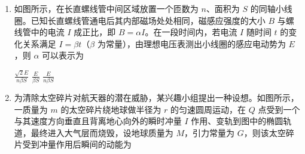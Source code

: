\documentclass[\gkver]{gaokaozhenti}
\begin{document}
\begin{enumerate}
{$\Delta x$ 变大}
{双缝间的距离减小}
{双缝间的距离不变}


\item
如图所示，在长直螺线管中间区域放置一个匝数为 $n$、面积为 $S$ 的同轴小线圈。已知长直螺线管通电后其内部磁场处处相同，磁感应强度的大小 $B$ 与螺线管中的电流 $I$ 成正比，即 $B = \alpha I$。在一段时间内，若电流 $I$ 随时间 $t$ 的变化关系满足 $I = \beta t$（$\beta$ 为常量），由理想电压表测出小线圈的感应电动势为 $E$，则 $\alpha$ 可以表示为

{$\frac{\sqrt{2}E}{n\beta S}$}
{$\frac{E}{\beta S}$}
{$\frac{E}{n\beta S}$}


\item
为清除太空碎片对航天器的潜在威胁，某兴趣小组提出一种设想。如图所示，一质量为 $m$ 的太空碎片绕地球做半径为 $r$ 的匀速圆周运动，在 $Q$ 点受到一个与其速度方向垂直且背离地心向外的瞬时冲量 $I$ 作用、变轨到图中的椭圆轨道，最终进入大气层而烧毁，设地球质量为 $M$，引力常量为 $G$，则该太空碎片受到冲量作用后瞬间的动能为
\onepicture[align=right, w=4.20cm]{}


\end{enumerate}
\end{document}
